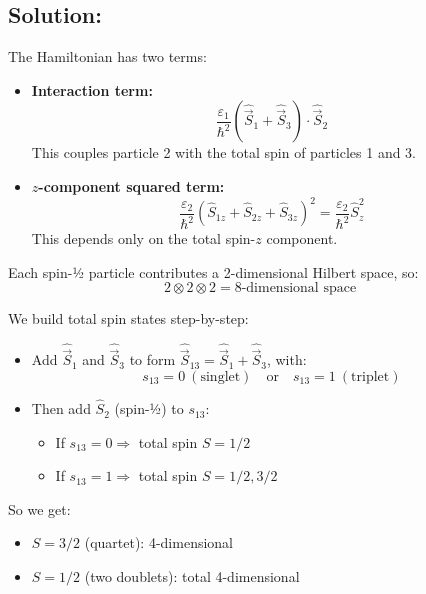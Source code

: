 \documentclass[12pt]{article}
\begin{document}
    \subsection{Solution:}
        The Hamiltonian has two terms:
        \begin{itemize}
            \item \textbf{Interaction term:}
            \[
            \frac{\varepsilon_1}{\hbar^2}(\hat{\vec{S}}_1 + \hat{\vec{S}}_3) \cdot \hat{\vec{S}}_2
            \]
            This couples particle 2 with the total spin of particles 1 and 3.
        
            \item \textbf{\( z \)-component squared term:}
            \[
            \frac{\varepsilon_2}{\hbar^2}(\hat{S}_{1z} + \hat{S}_{2z} + \hat{S}_{3z})^2 = \frac{\varepsilon_2}{\hbar^2} \hat{S}_z^2
            \]
            This depends only on the total spin-\( z \) component.
        \end{itemize}

        Each spin-½ particle contributes a 2-dimensional Hilbert space, so:
        \[
            2 \otimes 2 \otimes 2 = 8\text{-dimensional space}
        \]

        We build total spin states step-by-step:
        \begin{itemize}
            \item Add \( \hat{\vec{S}}_1 \) and \( \hat{\vec{S}}_3 \) to form \( \hat{\vec{S}}_{13} = \hat{\vec{S}}_1 + \hat{\vec{S}}_3 \), with:
            \[
            s_{13} = 0 \ (\text{singlet}) \quad \text{or} \quad s_{13} = 1 \ (\text{triplet})
            \]
        
            \item Then add \( \hat{S}_2 \) (spin-½) to \( s_{13} \):
        
            \begin{itemize}
                \item If \( s_{13} = 0 \Rightarrow \) total spin \( S = 1/2 \)
                \item If \( s_{13} = 1 \Rightarrow \) total spin \( S = 1/2, 3/2 \)
            \end{itemize}
        \end{itemize}

        So we get:
        \begin{itemize}
            \item \( S = 3/2 \) (quartet): 4-dimensional
            \item \( S = 1/2 \) (two doublets): total 4-dimensional
        \end{itemize}
\end{document}
